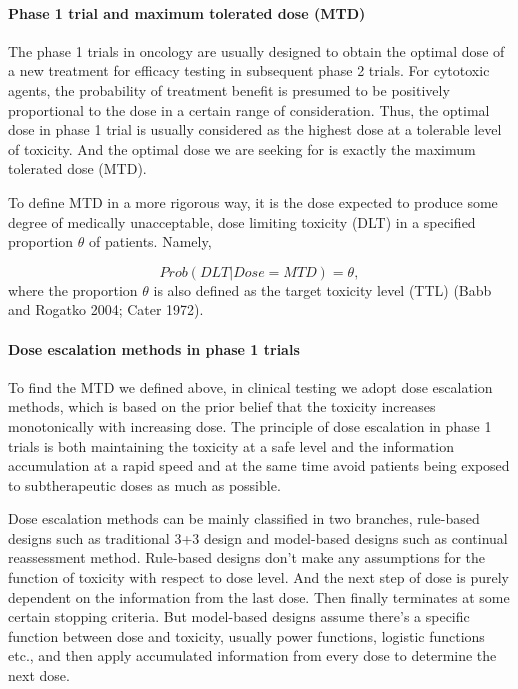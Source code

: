 \documentclass[
]{article}
\begin{document}
\hypertarget{phase-1-trial-and-maximum-tolerated-dose-mtd}{%
\paragraph{Phase 1 trial and maximum tolerated dose
(MTD)}\label{phase-1-trial-and-maximum-tolerated-dose-mtd}}

The phase 1 trials in oncology are usually designed to obtain the
optimal dose of a new treatment for efficacy testing in subsequent phase
2 trials. For cytotoxic agents, the probability of treatment benefit is
presumed to be positively proportional to the dose in a certain range of
consideration. Thus, the optimal dose in phase 1 trial is usually
considered as the highest dose at a tolerable level of toxicity. And the
optimal dose we are seeking for is exactly the maximum tolerated dose
(MTD).

To define MTD in a more rigorous way, it is the dose expected to produce
some degree of medically unacceptable, dose limiting toxicity (DLT) in a
specified proportion \(\theta\) of patients. Namely,

\[Prob(DLT | Dose = MTD) = \theta,\] where the proportion \(\theta\) is
also defined as the target toxicity level (TTL) (Babb and Rogatko 2004;
Cater 1972).

\hypertarget{dose-escalation-methods-in-phase-1-trials}{%
\paragraph{Dose escalation methods in phase 1
trials}\label{dose-escalation-methods-in-phase-1-trials}}

To find the MTD we defined above, in clinical testing we adopt dose
escalation methods, which is based on the prior belief that the toxicity
increases monotonically with increasing dose. The principle of dose
escalation in phase 1 trials is both maintaining the toxicity at a safe
level and the information accumulation at a rapid speed and at the same
time avoid patients being exposed to subtherapeutic doses as much as
possible.

Dose escalation methods can be mainly classified in two branches,
rule-based designs such as traditional 3+3 design and model-based
designs such as continual reassessment method. Rule-based designs don't
make any assumptions for the function of toxicity with respect to dose
level. And the next step of dose is purely dependent on the information
from the last dose. Then finally terminates at some certain stopping
criteria. But model-based designs assume there's a specific function
between dose and toxicity, usually power functions, logistic functions
etc., and then apply accumulated information from every dose to
determine the next dose.
\end{document}
